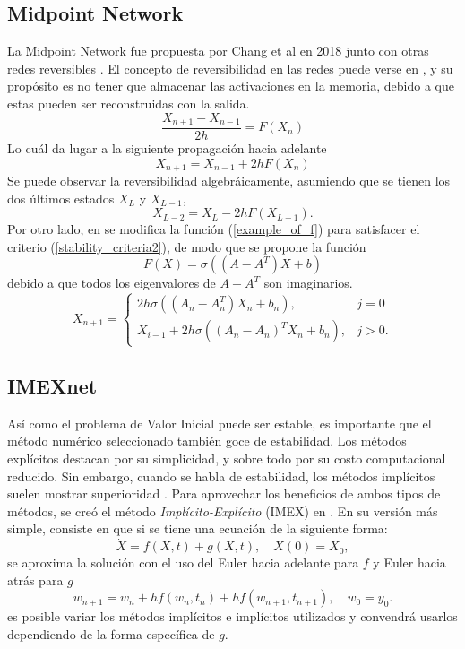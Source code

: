  \subsection{Midpoint Network}
 La Midpoint Network fue propuesta por Chang et al en 2018 junto con otras  redes reversibles \cite{reversible_nets}. El concepto de reversibilidad en las redes puede verse en \cite{reversible_definitions}, y su propósito es no tener que almacenar las activaciones en la memoria, debido a que estas pueden ser reconstruidas con la salida.
 \begin{equation}
    \frac{X_{n+1} - X_{n-1}}{2h} = F(X_n)
 \end{equation}
 Lo cuál da lugar a la siguiente propagación hacia adelante
 \begin{equation}
    X_{n+1} = X_{n-1} + 2hF(X_n)
 \end{equation}
 Se puede observar la reversibilidad algebráicamente, asumiendo que se tienen los dos últimos estados $X_L$ y $X_{L-1}$,
 \begin{equation}
    X_{L-2} = X_{L} - 2hF(X_{L-1}).
 \end{equation}
Por otro lado, en \cite{reversible_nets} se modifica la función (\ref{example_of_f}) para satisfacer el criterio (\ref{stability_criteria2}), de modo que se propone la función 
\begin{equation}
   F(X) = \sigma((A-A^T)X + b)
\end{equation}
debido a que todos los eigenvalores de $A -A^T$ son imaginarios. 
\begin{equation}
   X_{n+1} = \left\{ \begin{matrix}
      2h\sigma((A_n - A_n^T)X_n + b_n), &  j= 0 \\
      X_{i -1} + 2h\sigma((A_n - A_n)^TX_n + b_n), & j > 0.
   \end{matrix}\right.
\end{equation}
 
\subsection{IMEXnet}
Así como el problema de Valor Inicial puede ser estable, es importante que el método numérico seleccionado también goce de estabilidad. Los métodos explícitos destacan por su simplicidad, y sobre todo por su costo computacional reducido. Sin embargo, cuando se habla de estabilidad, los métodos implícitos suelen mostrar superioridad \cite{computer_methods}. Para aprovechar los beneficios de ambos tipos de métodos, se creó el método \textsl{Implícito-Explícito} (IMEX) en \cite{imex_method}. En su versión más simple, consiste en que si se tiene una ecuación de la siguiente forma:
\begin{equation}
   \dot  X = f(X,t) + g(X,t), \quad X(0) = X_0,
\end{equation}
se aproxima la solución con el uso del Euler hacia adelante para $f$ y Euler hacia atrás para $g$
\begin{equation}
   w_{n+1} = w_n + hf(w_n, t_{n}) + hf(w_{n+1}, t_{n+1}), \quad w_0 = y_0. 
\end{equation}
es posible variar los métodos implícitos e implícitos utilizados y convendrá usarlos dependiendo de la forma específica de $g$.

